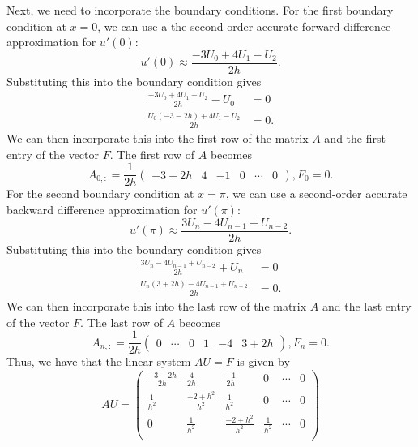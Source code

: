 \documentclass{article}
\begin{document}
\begin{enumerate}[(a)]
  Next, we need to incorporate the boundary conditions. For the first boundary condition at $x=0$, we can use a the second order accurate forward difference approximation for $u'(0)$:
  \begin{equation*}
    u'(0) \approx \frac{-3U_0 + 4U_1 - U_2}{2h}.
  \end{equation*}
  Substituting this into the boundary condition gives
  \begin{align*}
    \frac{-3U_0 + 4U_1 - U_2}{2h} - U_0 &= 0 \\
    \frac{U_0(-3-2h) + 4U_1 - U_2}{2h} &= 0.
  \end{align*}
  We can then incorporate this into the first row of the matrix $A$ and the first entry of the vector $F$. The first row of $A$ becomes
  \begin{equation*}
    A_{0,:} = \frac{1}{2h}\begin{pmatrix}
      -3 - 2h & 4 & -1 & 0 & \cdots & 0
    \end{pmatrix},
    F_0 = 0.
  \end{equation*}
  For the second boundary condition at $x=\pi$, we can use a second-order accurate backward difference approximation for $u'(\pi)$:
  \begin{equation*}
    u'(\pi) \approx \frac{3U_n - 4U_{n-1} + U_{n-2}}{2h}.
  \end{equation*}
  Substituting this into the boundary condition gives
  \begin{align*}
    \frac{3U_n - 4U_{n-1} + U_{n-2}}{2h} + U_n &= 0 \\
    \frac{U_n(3 + 2h) - 4U_{n-1} + U_{n-2}}{2h} &= 0.
  \end{align*}
  We can then incorporate this into the last row of the matrix $A$ and the last entry of the vector $F$. The last row of $A$ becomes
  \begin{equation*}
    A_{n,:} = \frac{1}{2h}\begin{pmatrix}
      0 & \cdots & 0 & 1 & -4 & 3 + 2h
    \end{pmatrix},
    F_n = 0.
  \end{equation*}
  Thus, we have that the linear system $AU = F$ is given by
  \begin{equation*}
    AU = \begin{pmatrix}
      \frac{-3 - 2h}{2h} & \frac{4}{2h} & \frac{-1}{2h} & 0 & \cdots & 0 \\
      \frac{1}{h^2} & \frac{-2 + h^2}{h^2} & \frac{1}{h^2} & 0 & \cdots & 0 \\
      0 & \frac{1}{h^2} & \frac{-2 + h^2}{h^2} & \frac{1}{h^2} & \cdots & 0 \\

\end{pmatrix}
\end{equation*}
\end{enumerate}
\end{document}
